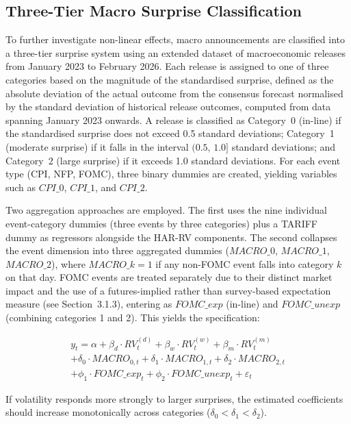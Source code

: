 \documentclass[12pt,a4paper]{report}
\begin{document}
\subsection{Three-Tier Macro Surprise Classification}
To further investigate non-linear effects, macro announcements are classified into a three-tier surprise system using an extended dataset of macroeconomic releases from January 2023 to February 2026. Each release is assigned to one of three categories based on the magnitude of the standardised surprise, defined as the absolute deviation of the actual outcome from the consensus forecast normalised by the standard deviation of historical release outcomes, computed from data spanning January 2023 onwards. A release is classified as Category~0 (in-line) if the standardised surprise does not exceed 0.5 standard deviations; Category~1 (moderate surprise) if it falls in the interval $(0.5,\,1.0]$ standard deviations; and Category~2 (large surprise) if it exceeds 1.0 standard deviations. For each event type (CPI, NFP, FOMC), three binary dummies are created, yielding variables such as $CPI\_0$, $CPI\_1$, and $CPI\_2$.

Two aggregation approaches are employed. The first uses the nine individual event-category dummies (three events by three categories) plus a TARIFF dummy as regressors alongside the HAR-RV components. The second collapses the event dimension into three aggregated dummies ($MACRO\_0$, $MACRO\_1$, $MACRO\_2$), where $MACRO\_k = 1$ if any non-FOMC event falls into category $k$ on that day. FOMC events are treated separately due to their distinct market impact and the use of a futures-implied rather than survey-based expectation measure (see Section~3.1.3), entering as $FOMC\_exp$ (in-line) and $FOMC\_unexp$ (combining categories 1 and 2). This yields the specification:

\begin{equation}
\begin{split}
y_t = \alpha + \beta_d \cdot RV_t^{(d)} + \beta_w \cdot RV_t^{(w)} + \beta_m \cdot RV_t^{(m)} \\
+ \delta_0 \cdot MACRO_{0,t} + \delta_1 \cdot MACRO_{1,t} + \delta_2 \cdot MACRO_{2,t} \\
+ \phi_1 \cdot FOMC\_exp_t + \phi_2 \cdot FOMC\_unexp_t + \varepsilon_t
\end{split}
\end{equation}

\noindent If volatility responds more strongly to larger surprises, the estimated coefficients should increase monotonically across categories ($\delta_0 < \delta_1 < \delta_2$).
\end{document}
